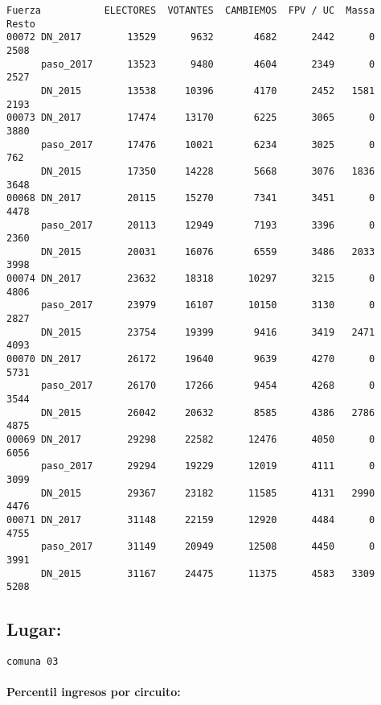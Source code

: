 \documentclass[11pt]{article}
\begin{document}
    \begin{verbatim}
Fuerza           ELECTORES  VOTANTES  CAMBIEMOS  FPV / UC  Massa  Resto
00072 DN_2017        13529      9632       4682      2442      0   2508
      paso_2017      13523      9480       4604      2349      0   2527
      DN_2015        13538     10396       4170      2452   1581   2193
00073 DN_2017        17474     13170       6225      3065      0   3880
      paso_2017      17476     10021       6234      3025      0    762
      DN_2015        17350     14228       5668      3076   1836   3648
00068 DN_2017        20115     15270       7341      3451      0   4478
      paso_2017      20113     12949       7193      3396      0   2360
      DN_2015        20031     16076       6559      3486   2033   3998
00074 DN_2017        23632     18318      10297      3215      0   4806
      paso_2017      23979     16107      10150      3130      0   2827
      DN_2015        23754     19399       9416      3419   2471   4093
00070 DN_2017        26172     19640       9639      4270      0   5731
      paso_2017      26170     17266       9454      4268      0   3544
      DN_2015        26042     20632       8585      4386   2786   4875
00069 DN_2017        29298     22582      12476      4050      0   6056
      paso_2017      29294     19229      12019      4111      0   3099
      DN_2015        29367     23182      11585      4131   2990   4476
00071 DN_2017        31148     22159      12920      4484      0   4755
      paso_2017      31149     20949      12508      4450      0   3991
      DN_2015        31167     24475      11375      4583   3309   5208
    \end{verbatim}

    
    \hypertarget{lugar}{%
\subsection{Lugar:}\label{lugar}}

    
    \begin{Verbatim}[commandchars=\\\{\}]
comuna 03

    \end{Verbatim}

    \hypertarget{percentil-ingresos-por-circuito}{%
\paragraph{Percentil ingresos por
circuito:}\label{percentil-ingresos-por-circuito}}
\end{document}
